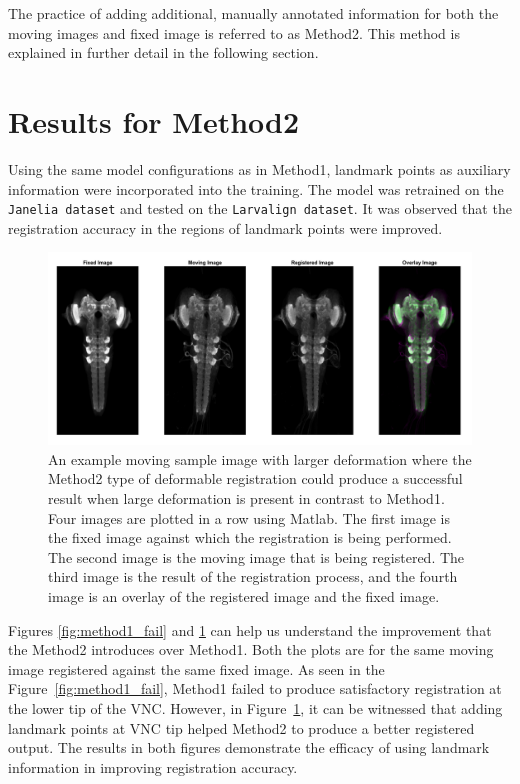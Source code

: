 \documentclass{report}
\begin{document}
	The practice of adding additional, manually annotated information for both the moving images and fixed image is referred to as Method2. This method is explained in further detail in the following section.
	
	\section{Results for Method2}
	Using the same model configurations as in Method1, landmark points as auxiliary information were incorporated into the training. The model was retrained on the \texttt{Janelia dataset} and tested on the \texttt{Larvalign dataset}. It was observed that the registration accuracy in the regions of landmark points were improved.
	
	\begin{figure}[h!]
		\centering
		\includegraphics[width=0.9\columnwidth]{resources/chapter4/method2/np_60H12_14E09_MB049B_020113B_scaled.tif.png}
		\caption{An example moving sample image with larger deformation where the Method2 type of deformable registration could produce a successful result when large deformation is present in contrast to Method1. Four images are plotted in a row using Matlab. The first image is the fixed image against which the registration is being performed. The second image is the moving image that is being registered. The third image is the result of the registration process, and the fourth image is an overlay of the registered image and the fixed image.}
		\label{fig:method2_fail}
	\end{figure}
	
	Figures \ref{fig:method1_fail} and \ref{fig:method2_fail} can help us understand the improvement that the Method2 introduces over Method1. Both the plots are for the same moving image registered against the same fixed image. As seen in  the Figure~\ref{fig:method1_fail}, Method1 failed to produce satisfactory registration at the lower tip of the VNC. However, in Figure~\ref{fig:method2_fail}, it can be witnessed that adding landmark points at VNC tip helped Method2 to produce a better registered output. The results in both figures demonstrate the efficacy of using landmark information in improving registration accuracy.
	
\end{document}
